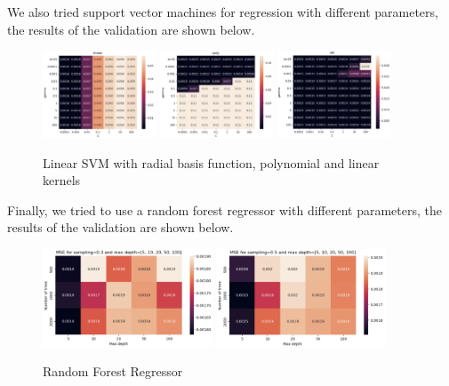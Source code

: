 \documentclass[12pt]{article}
\begin{document}
We also tried support vector machines for regression with different parameters,
the results of the validation are shown below.

\begin{figure}[h]
    \centering
    \includegraphics[width=0.3\textwidth]{svm_linear}
    \includegraphics[width=0.3\textwidth]{svm_poly}
    \includegraphics[width=0.3\textwidth]{svm_rbf}
    \caption{Linear SVM with radial basis function, polynomial and linear kernels}
    \label{fig:linear_svm}
\end{figure}

Finally, we tried to use a random forest regressor with different parameters,
the results of the validation are shown below.

\begin{figure}[h]
    \centering
    \includegraphics[width=0.45\textwidth]{rf_03}
    \includegraphics[width=0.45\textwidth]{rf_05}
    \caption{Random Forest Regressor}
    \label{fig:random_forest}
\end{figure}
\end{document}
